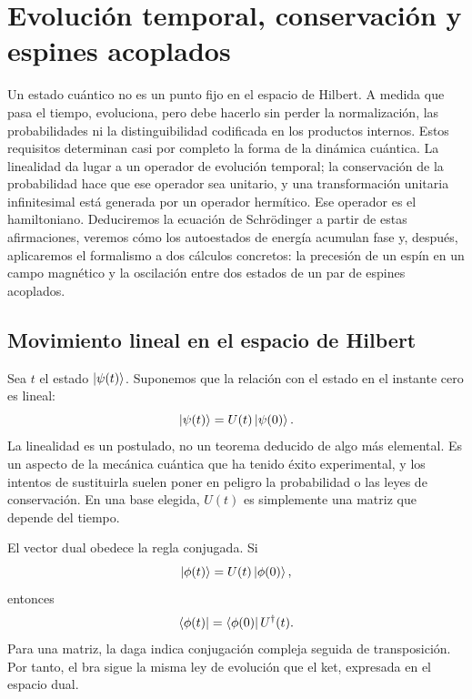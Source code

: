 \chapter{Evolución temporal, conservación y espines acoplados}

Un estado cuántico no es un punto fijo en el espacio de Hilbert. A medida que pasa el tiempo, evoluciona, pero debe hacerlo sin perder la normalización, las probabilidades ni la distinguibilidad codificada en los productos internos. Estos requisitos determinan casi por completo la forma de la dinámica cuántica. La linealidad da lugar a un operador de evolución temporal; la conservación de la probabilidad hace que ese operador sea unitario, y una transformación unitaria infinitesimal está generada por un operador hermítico. Ese operador es el hamiltoniano. Deduciremos la ecuación de Schr\"odinger a partir de estas afirmaciones, veremos cómo los autoestados de energía acumulan fase y, después, aplicaremos el formalismo a dos cálculos concretos: la precesión de un espín en un campo magnético y la oscilación entre dos estados de un par de espines acoplados.

\section{Movimiento lineal en el espacio de Hilbert}

Sea \(t\) el estado \(\left\lvert\psi(t)\right\rangle\). Suponemos que la relación con el estado en el instante cero es lineal:
\begin{equation}
\left\lvert\psi(t)\right\rangle=U(t)\left\lvert\psi(0)\right\rangle.
\end{equation}
La linealidad es un postulado, no un teorema deducido de algo más elemental. Es un aspecto de la mecánica cuántica que ha tenido éxito experimental, y los intentos de sustituirla suelen poner en peligro la probabilidad o las leyes de conservación. En una base elegida, \(U(t)\) es simplemente una matriz que depende del tiempo.

El vector dual obedece la regla conjugada. Si
\begin{equation}
\left\lvert\phi(t)\right\rangle=U(t)\left\lvert\phi(0)\right\rangle,
\end{equation}
entonces
\begin{equation}
\left\langle\phi(t)\right\rvert=\left\langle\phi(0)\right\rvert U^\dagger(t).
\end{equation}
Para una matriz, la daga indica conjugación compleja seguida de transposición. Por tanto, el bra sigue la misma ley de evolución que el ket, expresada en el espacio dual.

